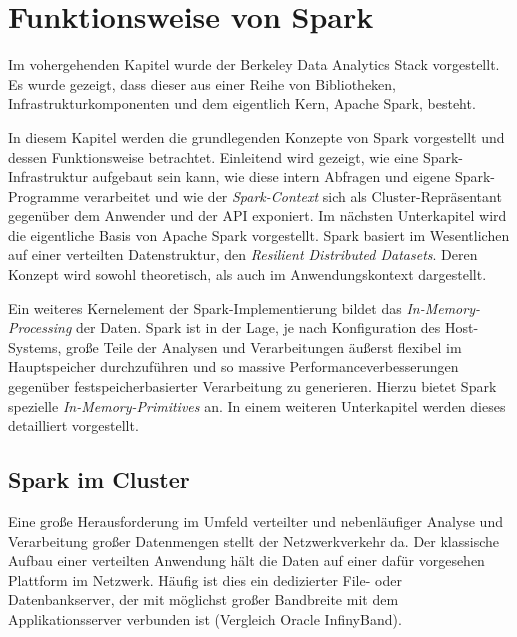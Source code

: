 \chapter{Funktionsweise von Spark}
\label{chapter:funktionsweise von Spark}


Im vohergehenden Kapitel wurde der Berkeley Data Analytics Stack vorgestellt. Es wurde gezeigt, dass dieser aus einer Reihe von Bibliotheken, Infrastrukturkomponenten und dem eigentlich Kern, Apache Spark, besteht.

In diesem Kapitel werden die grundlegenden Konzepte von Spark vorgestellt und dessen Funktionsweise betrachtet. Einleitend wird gezeigt, wie eine Spark-Infrastruktur aufgebaut sein kann, wie diese intern Abfragen und eigene Spark-Programme verarbeitet und wie der \textit{Spark-Context} sich als Cluster-Repräsentant gegenüber dem Anwender und der API exponiert. Im nächsten Unterkapitel wird die eigentliche Basis von Apache Spark vorgestellt. Spark basiert im Wesentlichen auf einer verteilten Datenstruktur, den \textit{Resilient Distributed Datasets}. Deren Konzept wird sowohl theoretisch, als auch im Anwendungskontext dargestellt. 

Ein weiteres Kernelement der Spark-Implementierung bildet das \textit{In-Memory-Processing} der Daten. Spark ist in der Lage, je nach Konfiguration des Host-Systems, große Teile der Analysen und Verarbeitungen äußerst flexibel im Hauptspeicher durchzuführen und so massive Performanceverbesserungen gegenüber festspeicherbasierter Verarbeitung zu generieren. Hierzu bietet Spark spezielle \textit{In-Memory-Primitives} an. In einem weiteren Unterkapitel werden dieses detailliert vorgestellt. 



\section{Spark im Cluster}
\label{section:spark im cluster}

Eine große Herausforderung im Umfeld verteilter und nebenläufiger Analyse und Verarbeitung großer Datenmengen stellt der Netzwerkverkehr da. Der klassische Aufbau einer verteilten Anwendung hält die Daten auf einer dafür vorgesehen Plattform im Netzwerk. Häufig ist dies ein dedizierter File- oder Datenbankserver, der mit möglichst großer Bandbreite mit dem Applikationsserver verbunden ist (Vergleich Oracle InfinyBand). 

